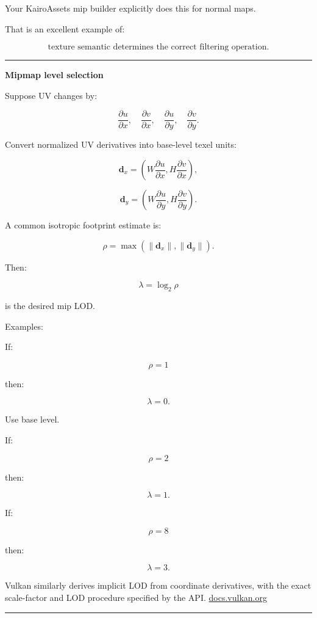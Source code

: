 Your KairoAssets mip builder explicitly does this for normal maps.

That is an excellent example of:

\[
\boxed{
\text{texture semantic determines the correct filtering operation}.
}
\]

\begin{center}\rule{0.5\linewidth}{0.5pt}\end{center}

\textbf{Mipmap level selection}

Suppose UV changes by:

\[
\frac{\partial u}{\partial x},
\quad
\frac{\partial v}{\partial x},
\quad
\frac{\partial u}{\partial y},
\quad
\frac{\partial v}{\partial y}.
\]

Convert normalized UV derivatives into base-level texel units:

\[
\mathbf d_x=
\left(
W\frac{\partial u}{\partial x},
H\frac{\partial v}{\partial x}
\right),
\]

\[
\mathbf d_y=
\left(
W\frac{\partial u}{\partial y},
H\frac{\partial v}{\partial y}
\right).
\]

A common isotropic footprint estimate is:

\[
\rho=
\max(
\|\mathbf d_x\|,
\|\mathbf d_y\|
).
\]

Then:

\[
\boxed{
\lambda=\log_2\rho
}
\]

is the desired mip LOD.

Examples:

If:

\[
\rho=1
\]

then:

\[
\lambda=0.
\]

Use base level.

If:

\[
\rho=2
\]

then:

\[
\lambda=1.
\]

If:

\[
\rho=8
\]

then:

\[
\lambda=3.
\]

Vulkan similarly derives implicit LOD from coordinate derivatives, with the exact scale-factor and LOD procedure specified by the API. \href{https://docs.vulkan.org/spec/latest/chapters/textures.html?utm_source=chatgpt.com}{docs.vulkan.org}

\begin{center}\rule{0.5\linewidth}{0.5pt}\end{center}

